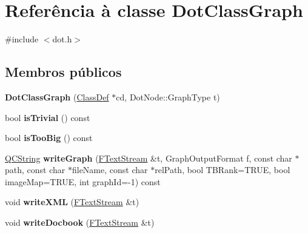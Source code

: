 \hypertarget{class_dot_class_graph}{\section{Referência à classe Dot\-Class\-Graph}
\label{class_dot_class_graph}
}


{\ttfamily \#include $<$dot.\-h$>$}

\subsection*{Membros públicos}
\begin{DoxyCompactItemize}
\item 
\hypertarget{class_dot_class_graph_af03afc12ef6b73b6dd653ff60da82e4b}{{\bfseries Dot\-Class\-Graph} (\hyperlink{class_class_def}{Class\-Def} $\ast$cd, Dot\-Node\-::\-Graph\-Type t)}\label{class_dot_class_graph_af03afc12ef6b73b6dd653ff60da82e4b}

\item 
\hypertarget{class_dot_class_graph_a3359ce63bc7239a94a35485704af1993}{bool {\bfseries is\-Trivial} () const }\label{class_dot_class_graph_a3359ce63bc7239a94a35485704af1993}

\item 
\hypertarget{class_dot_class_graph_a5867a12e614d417ec919a945ffa92cb1}{bool {\bfseries is\-Too\-Big} () const }\label{class_dot_class_graph_a5867a12e614d417ec919a945ffa92cb1}

\item 
\hypertarget{class_dot_class_graph_ad47ec9ba97ad3266c56b0bab2a412d9a}{\hyperlink{class_q_c_string}{Q\-C\-String} {\bfseries write\-Graph} (\hyperlink{class_f_text_stream}{F\-Text\-Stream} \&t, Graph\-Output\-Format f, const char $\ast$path, const char $\ast$file\-Name, const char $\ast$rel\-Path, bool T\-B\-Rank=T\-R\-U\-E, bool image\-Map=T\-R\-U\-E, int graph\-Id=-\/1) const }\label{class_dot_class_graph_ad47ec9ba97ad3266c56b0bab2a412d9a}

\item 
\hypertarget{class_dot_class_graph_acb326c95f60ee5e186e386f41c2d1e9e}{void {\bfseries write\-X\-M\-L} (\hyperlink{class_f_text_stream}{F\-Text\-Stream} \&t)}\label{class_dot_class_graph_acb326c95f60ee5e186e386f41c2d1e9e}

\item 
\hypertarget{class_dot_class_graph_ac8e038a04d11565bfe448e7a67513890}{void {\bfseries write\-Docbook} (\hyperlink{class_f_text_stream}{F\-Text\-Stream} \&t)}\label{class_dot_class_graph_ac8e038a04d11565bfe448e7a67513890}


\end{DoxyCompactItemize}
